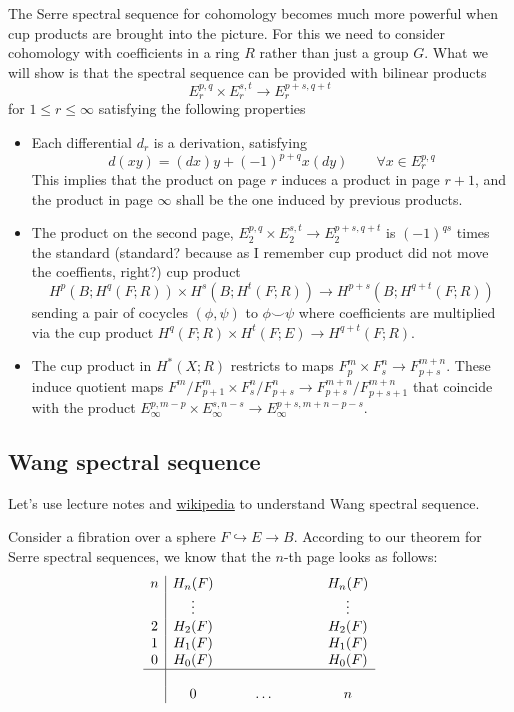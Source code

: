 \begin{remark}
\begin{defn}
The Serre spectral sequence for cohomology becomes much more powerful when cup products are brought into the picture. For this we need to consider cohomology with coefficients in a ring $R$ rather than just a group $G$. What we will show is that the spectral sequence can be provided with bilinear products
\[E^{p,q}_{r}\times E^{s,t}_{r}\to E^{p+s,q+t}_{r}\]
for $1\leq r\leq \infty$ satisfying the following properties
\begin{itemize}
	\item Each differential $d_{r}$ is a derivation, satisfying
		\[d(xy)=(dx)y+(-1)^{p+q} x(dy)\qquad \forall x\in E^{p,q}_{r}\]
	This implies that the product on page $r$ induces a product in page $r+1$, and the product in page $\infty$ shall be the one induced by previous products.
	\item The product on the second page, $E^{p,q}_{2}\times E^{s,t}_{2}\to E^{p+s,q+t}_{2}$ is $(-1)^{qs}$ times the standard {\color{magenta}(standard? because as I remember cup product did not move the coeffients, right?)} cup product
		\[H^{p}(B;H^{q}(F;R))\times H^{s}(B;H^{t}(F;R))\to H^{p+s}(B;H^{q+t}(F;R))\]
		sending a pair of cocycles $(\phi,\psi)$ to $\phi\smile \psi$ {\color{magenta}where coefficients are multiplied via the cup product $H^{q}(F;R)\times H^{t}(F;E)\to H^{q+t}(F;R)$}.
	\item The cup product in $H^{*}(X;R)$ restricts to maps $F^{m}_{p}\times F^{n}_{s}\to F^{m+n}_{p+s}$. These induce quotient maps $F^{ m}/F^{m}_{p+1}\times F^{n}_s/F^{n}_{p+s}\to F^{m+n}_{p+s}/F^{m+n}_{p+s+1}$ that coincide with the product $E^{p,m-p}_{\infty}\times E^{s,n-s}_{\infty}\to E^{p+s,m+n-p-s}_{\infty}$.
\end{itemize}

\subsection{Wang spectral sequence}

Let's use lecture notes and \href{https://en.wikipedia.org/wiki/Spectral_sequence#Wang_sequence}{wikipedia} to understand Wang spectral sequence.

Consider a fibration over a sphere $F\hookrightarrow E\to B$. According to our theorem for Serre spectral sequences, we know that the $n$-th page looks as follows:
\begin{align*}
\begin{array}{c|cccccccc}
	n&H_n(F)&&&&&&&H_{n}(F)\\
	 &\vdots&&&&&&&\vdots\\
	2&H_2(F)&&&&&&&H_2(F)\\
	1&H_1(F)&&&&&&&H_1(F)\\
	0&H_0(F)&&&&&&&H_0(F)\\
	\hline\\
	 &0&&&\ldots&&&&n
\end{array}
\end{align*}


\end{defn}
\end{remark}
